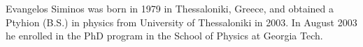 \renewcommand{\inputfile}{\version\ - edited 2008-06-26 vita}

Evangelos Siminos was born in 1979 in Thessaloniki, Greece, and
obtained a Ptyhion (B.S.) in physics from University of Thessaloniki
in 2003. In August 2003 he enrolled in the PhD program in the School of
Physics at Georgia Tech.